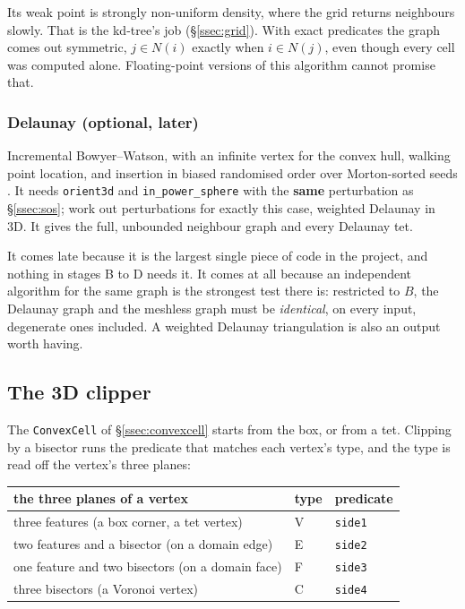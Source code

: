 \documentclass[11pt,a4paper]{article}
\newcommand{\code}[1]{\texttt{#1}}          %
\newcommand{\secref}[1]{\S\ref{#1}}
\begin{document}
Its weak point is strongly non-uniform density, where the grid returns neighbours slowly. That is
the kd-tree's job (\secref{ssec:grid}). With exact predicates the graph comes out symmetric,
$j \in N(i)$ exactly when $i \in N(j)$, even though every cell was computed alone.
Floating-point versions of this algorithm cannot promise that.

\subsubsection{Delaunay (optional, later)}\label{sssec:delaunay}

Incremental Bowyer--Watson, with an infinite vertex for the convex hull, walking point location,
and insertion in biased randomised order over Morton-sorted seeds \citep{amenta2003}. It needs
\code{orient3d} and \code{in\_power\_sphere} with the \textbf{same} perturbation as
\secref{ssec:sos}; \citet{devillers2011} work out perturbations for exactly this case, weighted
Delaunay in 3D. It gives the full, unbounded neighbour graph and every Delaunay tet.

It comes late because it is the largest single piece of code in the project, and nothing in
stages B to D needs it. It comes at all because an independent algorithm for the same graph is
the strongest test there is: restricted to $B$, the Delaunay graph and the meshless graph must be
\emph{identical}, on every input, degenerate ones included. A weighted Delaunay triangulation is
also an output worth having.

\subsection{The 3D clipper}\label{ssec:clipper3d}

The \code{ConvexCell} of \secref{ssec:convexcell} starts from the box, or from a tet. Clipping by
a bisector runs the predicate that matches each vertex's type, and the type is read off the
vertex's three planes:

{\small
\begin{xltabular}{\linewidth}{@{}L P{1.2cm} P{2cm}@{}}
\toprule
the three planes of a vertex & type & predicate \\
\midrule
\endhead
three features (a box corner, a tet vertex)            & V & \code{side1} \\
two features and a bisector (on a domain edge)         & E & \code{side2} \\
one feature and two bisectors (on a domain face)       & F & \code{side3} \\
three bisectors (a Voronoi vertex)                     & C & \code{side4} \\
\bottomrule
\end{xltabular}}
\end{document}
